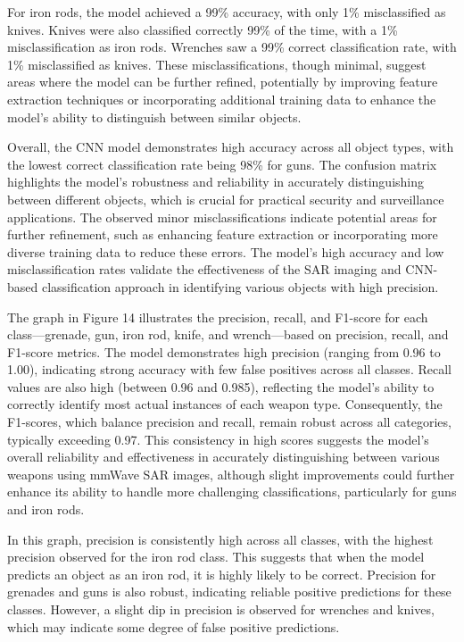 \documentclass[journal,article,submit,pdftex,moreauthors]{Definitions/mdpi}
\begin{document}
For iron rods, the model achieved a 99\% accuracy, with only 1\% misclassified as knives. Knives were also classified correctly 99\% of the time, with a 1\% misclassification as iron rods. Wrenches saw a 99\% correct classification rate, with 1\% misclassified as knives. These misclassifications, though minimal, suggest areas where the model can be further refined, potentially by improving feature extraction techniques or incorporating additional training data to enhance the model's ability to distinguish between similar objects.

Overall, the CNN model demonstrates high accuracy across all object types, with the lowest correct classification rate being 98\% for guns. The confusion matrix highlights the model's robustness and reliability in accurately distinguishing between different objects, which is crucial for practical security and surveillance applications. The observed minor misclassifications indicate potential areas for further refinement, such as enhancing feature extraction or incorporating more diverse training data to reduce these errors. The model's high accuracy and low misclassification rates validate the effectiveness of the SAR imaging and CNN-based classification approach in identifying various objects with high precision.


The graph in Figure 14 illustrates the precision, recall, and F1-score for each class—grenade, gun, iron rod, knife, and wrench—based on precision, recall, and F1-score metrics. The model demonstrates high precision (ranging from 0.96 to 1.00), indicating strong accuracy with few false positives across all classes. Recall values are also high (between 0.96 and 0.985), reflecting the model's ability to correctly identify most actual instances of each weapon type. Consequently, the F1-scores, which balance precision and recall, remain robust across all categories, typically exceeding 0.97. This consistency in high scores suggests the model's overall reliability and effectiveness in accurately distinguishing between various weapons using mmWave SAR images, although slight improvements could further enhance its ability to handle more challenging classifications, particularly for guns and iron rods.

In this graph, precision is consistently high across all classes, with the highest precision observed for the iron rod class. This suggests that when the model predicts an object as an iron rod, it is highly likely to be correct. Precision for grenades and guns is also robust, indicating reliable positive predictions for these classes. However, a slight dip in precision is observed for wrenches and knives, which may indicate some degree of false positive predictions.
\end{document}
